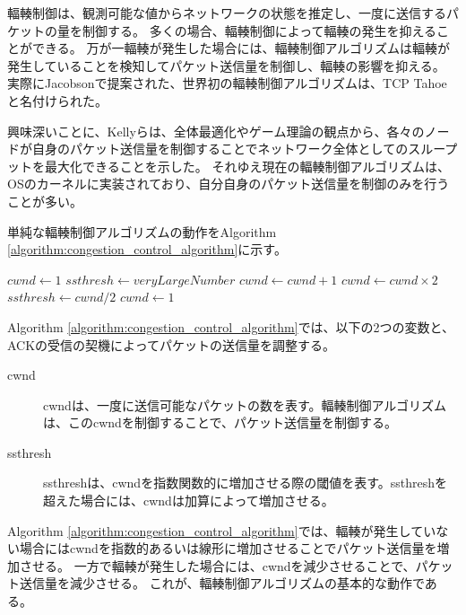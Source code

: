 \documentclass[a4paper,11pt]{jreport}
\newcommand{\algorithmref}[1]{Algorithm \ref{#1}}
\begin{document}
輻輳制御\cite{congestion-avoidance}は、観測可能な値からネットワークの状態を推定し、一度に送信するパケットの量を制御する。
多くの場合、輻輳制御によって輻輳の発生を抑えることができる。
万が一輻輳が発生した場合には、輻輳制御アルゴリズムは輻輳が発生していることを検知してパケット送信量を制御し、輻輳の影響を抑える。
実際にJacobson\cite{congestion-avoidance}で提案された、世界初の輻輳制御アルゴリズムは、TCP Tahoeと名付けられた。

興味深いことに、Kellyら\cite{kelly1998rate}は、全体最適化やゲーム理論の観点から、各々のノードが自身のパケット送信量を制御することでネットワーク全体としてのスループットを最大化できることを示した。
それゆえ現在の輻輳制御アルゴリズムは、OSのカーネルに実装されており、自分自身のパケット送信量を制御のみを行うことが多い。

単純な輻輳制御アルゴリズムの動作を\algorithmref{algorithm:congestion_control_algorithm}に示す。
\begin{algorithm}
  \caption{Basic Congestion Control Algorithm}
  \label{algorithm:congestion_control_algorithm}
  \begin{algorithmic}[1]
  \State $cwnd \gets 1$
  \State $ssthresh \gets veryLargeNumber$
            \State $cwnd \gets cwnd + 1$
        \Else
            \State $cwnd \gets cwnd \times 2$
        \EndIf
      \EndIf
          \State $ssthresh \gets cwnd / 2$
          \State $cwnd \gets 1$
      \EndIf
  \EndWhile
  \end{algorithmic}
\end{algorithm}
\algorithmref{algorithm:congestion_control_algorithm}では、以下の2つの変数と、ACKの受信の契機によってパケットの送信量を調整する。

\begin{description}
  \item[cwnd] cwndは、一度に送信可能なパケットの数を表す。輻輳制御アルゴリズムは、このcwndを制御することで、パケット送信量を制御する。
  \item[ssthresh] ssthreshは、cwndを指数関数的に増加させる際の閾値を表す。ssthreshを超えた場合には、cwndは加算によって増加させる。
\end{description}
\algorithmref{algorithm:congestion_control_algorithm}では、輻輳が発生していない場合にはcwndを指数的あるいは線形に増加させることでパケット送信量を増加させる。
一方で輻輳が発生した場合には、cwndを減少させることで、パケット送信量を減少させる。
これが、輻輳制御アルゴリズムの基本的な動作である。
\end{document}
